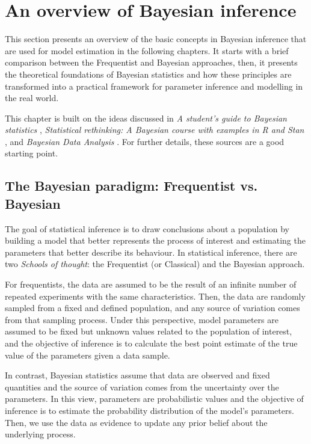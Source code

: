 \chapter{An overview of Bayesian inference}

This section presents an overview of the basic concepts in 
Bayesian inference that are used for model estimation in the 
following chapters. It starts with a brief comparison between 
the Frequentist and Bayesian approaches, then, it presents the 
theoretical foundations of Bayesian statistics and how these 
principles are transformed into a practical framework for 
parameter inference and modelling in the real world.

This chapter is built on the ideas discussed in 
\textit{A student's guide to Bayesian statistics} \citep{Lambert2018}, 
\textit{Statistical rethinking: A Bayesian course with examples in {R}
and Stan} \citep{McElreath2016}, and 
\textit{Bayesian Data Analysis} \citep{Gelman2013}. For further 
details, these sources are a good starting point.

\section{The Bayesian paradigm: Frequentist vs. Bayesian}

The goal of statistical inference is to draw conclusions about 
a population by building a model that better represents the 
process of interest and estimating the parameters that better 
describe its behaviour. In statistical inference, there are two 
\textit{Schools of thought}: the Frequentist (or Classical)  and the 
Bayesian approach. 

For frequentists, the data are assumed to be the result of an 
infinite number of repeated experiments with the same 
characteristics.  Then, the data are randomly sampled from a 
fixed and defined population, and any source of variation comes 
from that sampling process. Under this perspective, model 
parameters are assumed to be fixed but unknown values related 
to the population of interest, and the objective of inference 
is to calculate the best point estimate of the true value of 
the parameters given a data sample.

In contrast, Bayesian statistics assume that data are observed 
and fixed quantities and the source of variation comes from the 
uncertainty over the parameters. In this view, parameters are 
probabilistic values and the objective of inference is to 
estimate the probability distribution of the model’s parameters. 
Then, we use the data as evidence to update any prior belief 
about the underlying process.

